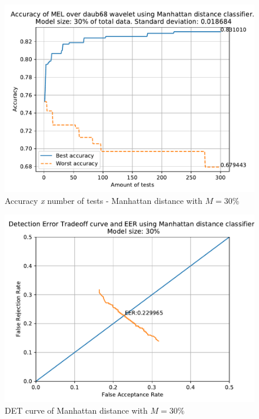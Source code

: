 	
		 \begin{figure}[H]
			\centering
			\includegraphics[scale=.8]{images/results/confusionMatrices/classifier_Manhattan_30.pdf}
			\caption{Accuracy \textit{x} number of tests - Manhattan distance with $M=30\%$}
			\label{fig:classifiermanhattan30}
		\end{figure}
		\begin{figure}[H]
			\centering
			\includegraphics[scale=.8]{images/results/det/DET_for_classifier_Manhattan_30.pdf}
			\caption{DET curve of Manhattan distance with $M=30\%$}
			\label{fig:detforclassifiermanhattan30}
		\end{figure}
	

